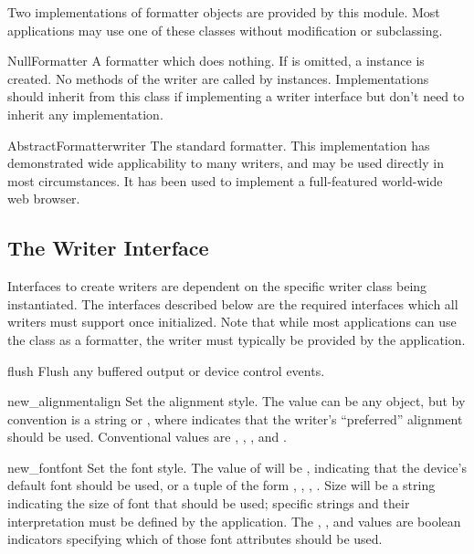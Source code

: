 Two implementations of formatter objects are provided by this module.
Most applications may use one of these classes without modification or
subclassing.

\begin{classdesc}{NullFormatter}{}
A formatter which does nothing.  If  is omitted, a
 instance is created.  No methods of the writer are
called by  instances.  Implementations should
inherit from this class if implementing a writer interface but don't
need to inherit any implementation.
\end{classdesc}

\begin{classdesc}{AbstractFormatter}{writer}
The standard formatter.  This implementation has demonstrated wide
applicability to many writers, and may be used directly in most
circumstances.  It has been used to implement a full-featured
world-wide web browser.
\end{classdesc}



\subsection{The Writer Interface}

Interfaces to create writers are dependent on the specific writer
class being instantiated.  The interfaces described below are the
required interfaces which all writers must support once initialized.
Note that while most applications can use the
 class as a formatter, the writer must
typically be provided by the application.


\begin{methoddesc}[writer]{flush}{}
Flush any buffered output or device control events.
\end{methoddesc}

\begin{methoddesc}[writer]{new_alignment}{align}
Set the alignment style.  The  value can be any object,
but by convention is a string or , where 
indicates that the writer's ``preferred'' alignment should be used.
Conventional  values are , ,
, and .
\end{methoddesc}

\begin{methoddesc}[writer]{new_font}{font}
Set the font style.  The value of  will be ,
indicating that the device's default font should be used, or a tuple
of the form \code{(}, , ,
\code{)}.  Size will be a string indicating the size of
font that should be used; specific strings and their interpretation
must be defined by the application.  The , , and
 values are boolean indicators specifying which of those
font attributes should be used.
\end{methoddesc}

